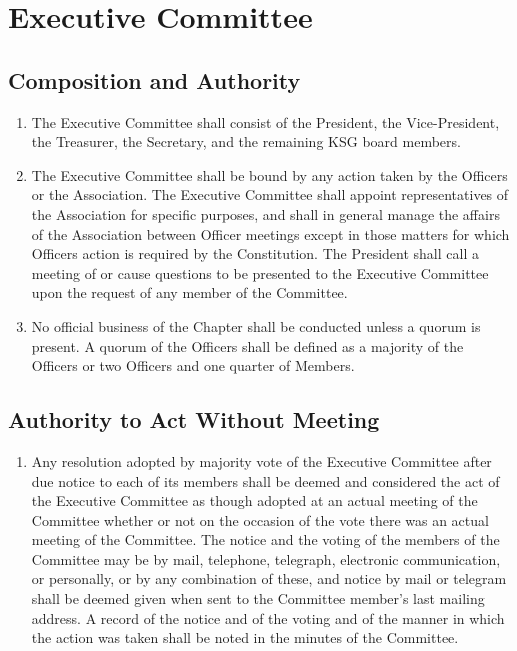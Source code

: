 \documentclass[12pt,letterpaper]{article}
\begin{document}
\section{Executive Committee}

\subsection{Composition and Authority}
\begin{enumerate}
  \item The Executive Committee shall consist of the President, the Vice-President, the
        Treasurer, the Secretary, and the remaining KSG board members.
  \item The Executive Committee shall be bound by any action taken by the Officers or
        the Association. The Executive Committee shall appoint representatives of the
        Association for specific purposes, and shall in general manage the affairs of
        the Association between Officer meetings except in those matters for which
        Officers action is required by the Constitution. The President shall
        call a meeting of or cause questions to be presented to the Executive
        Committee upon the request of any member of the Committee.
  \item No official business of the Chapter shall be conducted unless a quorum is
        present. A quorum of the Officers shall be defined as a majority of the
        Officers or two Officers and one quarter of Members.
\end{enumerate}

\subsection{Authority to Act Without Meeting}
\begin{enumerate}
  \item Any resolution adopted by majority vote of the Executive Committee after
        due notice to each of its members shall be deemed and considered the act
        of the Executive Committee as though adopted at an actual meeting of the
        Committee whether or not on the occasion of the vote there was an actual
        meeting of the Committee. The notice and the voting of the members
        of the Committee may be by mail, telephone, telegraph, electronic
        communication, or personally, or by any combination of these, and notice by
        mail or telegram shall be deemed given when sent to the Committee member's
        last mailing address. A record of the notice and of the voting and of the
        manner in which the action was taken shall be noted in the minutes of the
        Committee.
\end{enumerate}
\end{document}
